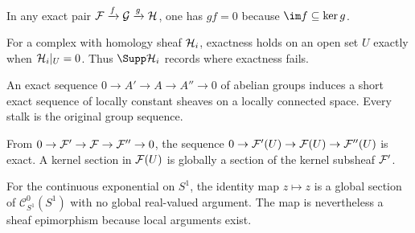 \begin{example}
In any exact pair $\mathcal F\xrightarrow{f}\mathcal G\xrightarrow{g}\mathcal H$, one has $gf=0$ because $\im f\subseteq\ker g$.
\end{example}

\begin{example}
For a complex with homology sheaf $\mathcal H_i$, exactness holds on an open set $U$ exactly when $\mathcal H_i|_U=0$.  Thus $\Supp\HH_i$ records where exactness fails.
\end{example}

\begin{example}
An exact sequence $0\to A'\to A\to A''\to0$ of abelian groups induces a short exact sequence of locally constant sheaves on a locally connected space.  Every stalk is the original group sequence.
\end{example}

\begin{example}
From $0\to\mathcal F'\to\mathcal F\to\mathcal F''\to0$, the sequence
$0\to\mathcal F'(U)\to\mathcal F(U)\to\mathcal F''(U)$ is exact.  A kernel section in $\mathcal F(U)$ is globally a section of the kernel subsheaf $\mathcal F'$.
\end{example}

\begin{example}
For the continuous exponential on $S^1$, the identity map $z\mapsto z$ is a global section of $\mathcal C^0_{S^1}(S^1)$ with no global real-valued argument.  The map is nevertheless a sheaf epimorphism because local arguments exist.
\end{example}

